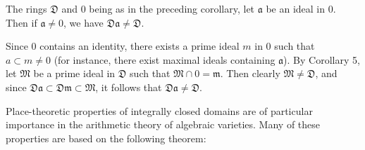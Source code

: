 The rings $\mathfrak{D}$ and $\mathfrak{0}$ being as in the preceding corollary, let $\mathfrak{a}$ be an ideal in $\mathfrak{0}$. Then if $\mathfrak{a} \neq \mathfrak{0}$, we have $\mathfrak{D}\mathfrak{a} \neq \mathfrak{D}$.

Since $\mathfrak{0}$ contains an identity, there exists a prime ideal $m$ in $\mathfrak{0}$ such that $a \subset m \neq \mathfrak{0}$ (for instance, there exist maximal ideals containing $\mathfrak{a}$). By Corollary 5, let $\mathfrak{M}$ be a prime ideal in $\mathfrak{D}$ such that $\mathfrak{M} \cap \mathfrak{0} = \mathfrak{m}$. Then clearly $\mathfrak{M} \neq \mathfrak{D}$, and since $\mathfrak{D}\mathfrak{a} \subset \mathfrak{D}\mathfrak{m} \subset \mathfrak{M}$, it follows that $\mathfrak{D}\mathfrak{a} \neq \mathfrak{D}$.

Place-theoretic properties of integrally closed domains are of particular importance in the arithmetic theory of algebraic varieties. Many of these properties are based on the following theorem: